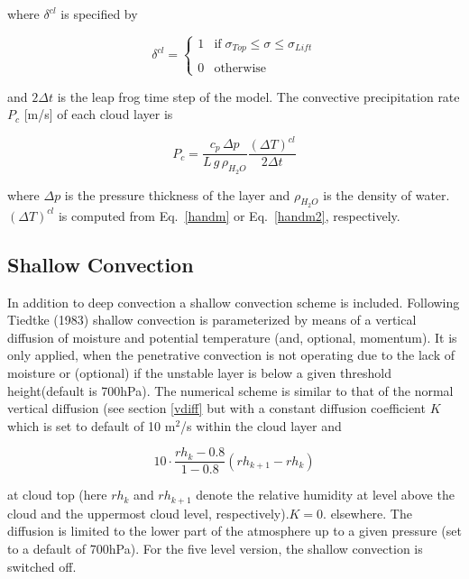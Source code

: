 where ${\delta}^{cl}$ is specified by

\begin{equation}
{\delta}^{cl} = \left\{ \begin{array}{ll} 1 & \mbox{if
} \;  \sigma_{Top} \le \sigma \le
\sigma_{Lift} \\ & \\ 0 & \mbox{otherwise}
\end{array} \right.
\end{equation}

and $2\Delta t$ is the leap frog time step of the model.
The convective precipitation rate
$P_{c}$ [m/s] of each cloud layer is

\begin{equation}
P_{c} =  \frac{c_p\, \Delta  p}{L\, g \, \rho_{H_2O}}
\frac{(\Delta T)^{cl}}{2\Delta t}
\end{equation} 

where $\Delta p$ is the pressure thickness of the layer
and $\rho_{H_2O}$ is the density of
water.  $(\Delta T)^{cl}$ is computed from
Eq.~\ref{handm} or Eq.~\ref{handm2},
respectively.

\subsection{Shallow Convection}
In addition to deep convection a shallow convection scheme is included. 
Following Tiedtke (1983) shallow convection is parameterized by means of a 
vertical diffusion of moisture and potential temperature (and, optional, 
momentum). It is only applied, when the penetrative convection is not 
operating due to the lack of moisture or (optional) if the unstable layer 
is below a given threshold height(default is 700hPa). The numerical scheme 
is similar to that of the normal vertical diffusion (see section \ref{vdiff} 
but with a constant diffusion coefficient $K$ which is set to default of 
10 m$^2$/s within the cloud layer and 

\begin{equation}
10 \cdot \frac{rh_k -0.8}{1-0.8}(rh_{k+1}-rh_k)
\end{equation}

at cloud top (here $rh_k$ and $rh_{k+1}$ 
denote the relative humidity at level above the cloud and the uppermost 
cloud level, respectively).$K=0.$ elsewhere. The diffusion is 
limited to the lower part of the atmosphere up to a 
given pressure (set to a default of
700hPa). For the five level version, the 
shallow convection is switched off. 


